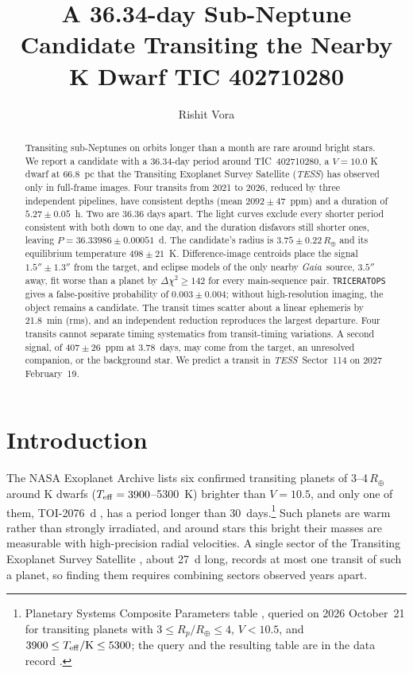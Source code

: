\documentclass[twocolumn,linenumbers]{aastex701}
\newcommand{\tic}{TIC~402710280}
\newcommand{\tess}{\textit{TESS}}
\newcommand{\gaia}{\textit{Gaia}}
\newcommand{\rearth}{R_\oplus}
\begin{document}
\title{A 36.34-day Sub-Neptune Candidate Transiting the Nearby K Dwarf TIC 402710280}

\author[orcid=0009-0003-8778-9883,gname=Rishit,sname=Vora]{Rishit Vora}

\begin{abstract}
Transiting sub-Neptunes on orbits longer than a month are rare around bright stars. We report a candidate with a 36.34-day period around \tic, a $V = 10.0$ K dwarf at 66.8~pc that the Transiting Exoplanet Survey Satellite (\tess) has observed only in full-frame images. Four transits from 2021 to 2026, reduced by three independent pipelines, have consistent depths (mean $2092 \pm 47$~ppm) and a duration of $5.27 \pm 0.05$~h. Two are 36.36 days apart. The light curves exclude every shorter period consistent with both down to one day, and the duration disfavors still shorter ones, leaving $P = 36.33986 \pm 0.00051$~d. The candidate's radius is $3.75 \pm 0.22\,\rearth$ and its equilibrium temperature $498 \pm 21$~K. Difference-image centroids place the signal $1.5'' \pm 1.3''$ from the target, and eclipse models of the only nearby \gaia\ source, $3.5''$ away, fit worse than a planet by $\Delta\chi^2 \geq 142$ for every main-sequence pair. \texttt{TRICERATOPS} gives a false-positive probability of $0.003 \pm 0.004$; without high-resolution imaging, the object remains a candidate. The transit times scatter about a linear ephemeris by 21.8~min (rms), and an independent reduction reproduces the largest departure. Four transits cannot separate timing systematics from transit-timing variations. A second signal, of $407 \pm 26$~ppm at 3.78~days, may come from the target, an unresolved companion, or the background star. We predict a transit in \tess\ Sector~114 on 2027 February~19.
\end{abstract}


\section{Introduction} \label{sec:intro}

The NASA Exoplanet Archive lists six confirmed transiting planets of 3--4\,$\rearth$ around K dwarfs ($T_{\rm eff} = 3900$--5300~K) brighter than $V = 10.5$, and only one of them, TOI-2076~d \citep[$P = 35.1$~d;][]{Hedges2021}, has a period longer than 30~days.\footnote{Planetary Systems Composite Parameters table \citep{NEAcomp}, queried on 2026 October~21 for transiting planets with $3 \leq R_p/\rearth \leq 4$, $V < 10.5$, and $3900 \leq T_{\rm eff}/{\rm K} \leq 5300$; the query and the resulting table are in the data record \citep{DataRecord}.} Such planets are warm rather than strongly irradiated, and around stars this bright their masses are measurable with high-precision radial velocities. A single sector of the Transiting Exoplanet Survey Satellite \citep[\tess;][]{Ricker2015}, about 27~d long, records at most one transit of such a planet, so finding them requires combining sectors observed years apart.
\end{document}
